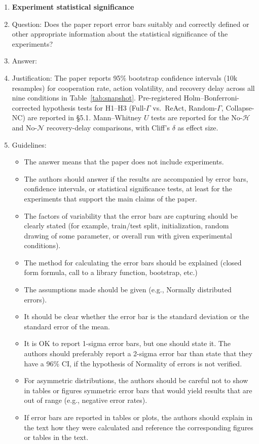 \begin{enumerate}
\item {\bf Experiment statistical significance}
    \item[] Question: Does the paper report error bars suitably and correctly defined or other appropriate information about the statistical significance of the experiments?
    \item[] Answer: \answerNo{}
    \item[] Justification: The paper reports 95\% bootstrap confidence intervals (10k resamples) for cooperation rate, action volatility, and recovery delay across all nine conditions in Table~\ref{tab:snapshot}. Pre-registered Holm--Bonferroni-corrected hypothesis tests for H1--H3 (Full-$\Gamma$ vs.\ ReAct, Random-$\Gamma$, Collapse-NC) are reported in \S5.1. Mann--Whitney $U$ tests are reported for the No-$\mathcal{H}$ and No-$\mathcal{N}$ recovery-delay comparisons, with Cliff's $\delta$ as effect size.
    \item[] Guidelines:
    \begin{itemize}
        \item The answer \answerNA{} means that the paper does not include experiments.
        \item The authors should answer \answerYes{} if the results are accompanied by error bars, confidence intervals, or statistical significance tests, at least for the experiments that support the main claims of the paper.
        \item The factors of variability that the error bars are capturing should be clearly stated (for example, train/test split, initialization, random drawing of some parameter, or overall run with given experimental conditions).
        \item The method for calculating the error bars should be explained (closed form formula, call to a library function, bootstrap, etc.)
        \item The assumptions made should be given (e.g., Normally distributed errors).
        \item It should be clear whether the error bar is the standard deviation or the standard error of the mean.
        \item It is OK to report 1-sigma error bars, but one should state it. The authors should preferably report a 2-sigma error bar than state that they have a 96\% CI, if the hypothesis of Normality of errors is not verified.
        \item For asymmetric distributions, the authors should be careful not to show in tables or figures symmetric error bars that would yield results that are out of range (e.g., negative error rates).
        \item If error bars are reported in tables or plots, the authors should explain in the text how they were calculated and reference the corresponding figures or tables in the text.
    \end{itemize}


\end{enumerate}
